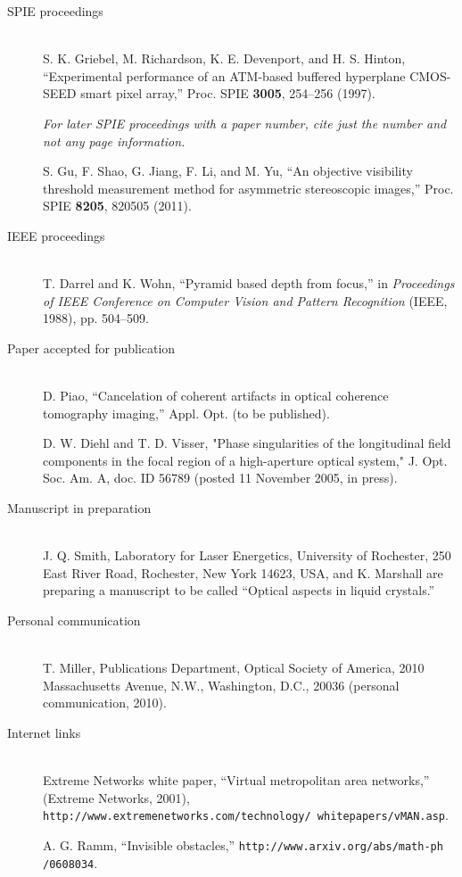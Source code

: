 \documentclass[10pt,letterpaper]{article}
\begin{document}
\begin{description}
\item[SPIE proceedings] \hfill\\
S. K. Griebel, M. Richardson, K. E. Devenport, and H. S. Hinton,
``Experimental performance of an ATM-based buffered hyperplane
CMOS-SEED smart pixel array,'' Proc. SPIE {\bf 3005}, 254--256 (1997).

{\it For later SPIE proceedings with a paper number, cite just the number and not any page information.}

S. Gu, F. Shao, G. Jiang, F. Li, and M. Yu,
``An objective visibility threshold measurement method for asymmetric stereoscopic images,''
Proc. SPIE {\bf 8205}, 820505 (2011).

\item[IEEE proceedings] \hfill\\
T. Darrel and K. Wohn, ``Pyramid based depth from focus,'' in
{\it Proceedings of IEEE Conference on Computer Vision and Pattern
Recognition} (IEEE, 1988), pp. 504--509.

\item[Paper accepted for publication] \hfill\\
D. Piao, ``Cancelation of coherent artifacts in optical coherence tomography imaging,'' Appl. Opt. (to be published).

D. W. Diehl and T. D. Visser,
"Phase singularities of the longitudinal field components in the focal region of a high-aperture optical system,"
J. Opt. Soc. Am. A, doc. ID 56789 (posted 11 November 2005, in press).

\item[Manuscript in preparation] \hfill\\
J. Q. Smith, Laboratory for Laser Energetics, University of Rochester, 250 East River Road, Rochester, New York 14623, USA, and K. Marshall are preparing a manuscript to be called ``Optical aspects in liquid crystals.''

\item[Personal communication] \hfill\\
T. Miller, Publications Department, Optical Society of
America, 2010 Massa\-chusetts Avenue, N.W., Washington, D.C.,
20036 (personal communication, 2010).

\item[Internet links] \hfill\\
Extreme Networks white paper, ``Virtual metropolitan area networks,'' (Extreme Networks, 2001), \texttt{http://www.extremenetworks.com/technology/
whitepapers/vMAN.asp}.

A. G. Ramm, ``Invisible obstacles,'' \texttt{http://www.arxiv.org/abs/math-ph
/0608034}.

\end{description}
\end{document}

